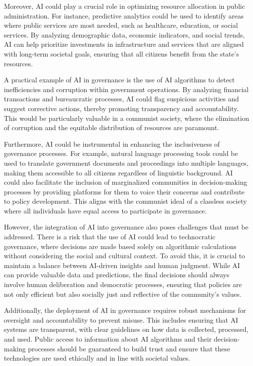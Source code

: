 Moreover, AI could play a crucial role in optimizing resource allocation in public administration. For instance, predictive analytics could be used to identify areas where public services are most needed, such as healthcare, education, or social services. By analyzing demographic data, economic indicators, and social trends, AI can help prioritize investments in infrastructure and services that are aligned with long-term societal goals, ensuring that all citizens benefit from the state’s resources.

A practical example of AI in governance is the use of AI algorithms to detect inefficiencies and corruption within government operations. By analyzing financial transactions and bureaucratic processes, AI could flag suspicious activities and suggest corrective actions, thereby promoting transparency and accountability. This would be particularly valuable in a communist society, where the elimination of corruption and the equitable distribution of resources are paramount.

Furthermore, AI could be instrumental in enhancing the inclusiveness of governance processes. For example, natural language processing tools could be used to translate government documents and proceedings into multiple languages, making them accessible to all citizens regardless of linguistic background. AI could also facilitate the inclusion of marginalized communities in decision-making processes by providing platforms for them to voice their concerns and contribute to policy development. This aligns with the communist ideal of a classless society where all individuals have equal access to participate in governance.

However, the integration of AI into governance also poses challenges that must be addressed. There is a risk that the use of AI could lead to technocratic governance, where decisions are made based solely on algorithmic calculations without considering the social and cultural context. To avoid this, it is crucial to maintain a balance between AI-driven insights and human judgment. While AI can provide valuable data and predictions, the final decisions should always involve human deliberation and democratic processes, ensuring that policies are not only efficient but also socially just and reflective of the community’s values.

Additionally, the deployment of AI in governance requires robust mechanisms for oversight and accountability to prevent misuse. This includes ensuring that AI systems are transparent, with clear guidelines on how data is collected, processed, and used. Public access to information about AI algorithms and their decision-making processes should be guaranteed to build trust and ensure that these technologies are used ethically and in line with societal values.

